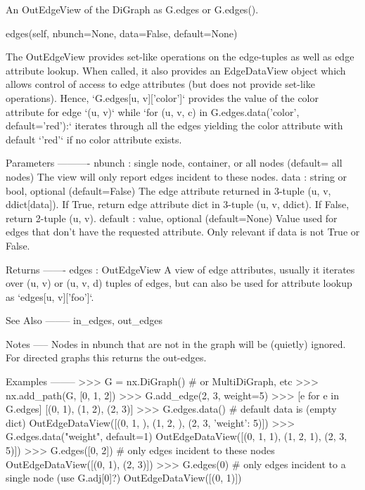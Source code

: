 \begin{DoxyVerb}An OutEdgeView of the DiGraph as G.edges or G.edges().

edges(self, nbunch=None, data=False, default=None)

The OutEdgeView provides set-like operations on the edge-tuples
as well as edge attribute lookup. When called, it also provides
an EdgeDataView object which allows control of access to edge
attributes (but does not provide set-like operations).
Hence, `G.edges[u, v]['color']` provides the value of the color
attribute for edge `(u, v)` while
`for (u, v, c) in G.edges.data('color', default='red'):`
iterates through all the edges yielding the color attribute
with default `'red'` if no color attribute exists.

Parameters
----------
nbunch : single node, container, or all nodes (default= all nodes)
    The view will only report edges incident to these nodes.
data : string or bool, optional (default=False)
    The edge attribute returned in 3-tuple (u, v, ddict[data]).
    If True, return edge attribute dict in 3-tuple (u, v, ddict).
    If False, return 2-tuple (u, v).
default : value, optional (default=None)
    Value used for edges that don't have the requested attribute.
    Only relevant if data is not True or False.

Returns
-------
edges : OutEdgeView
    A view of edge attributes, usually it iterates over (u, v)
    or (u, v, d) tuples of edges, but can also be used for
    attribute lookup as `edges[u, v]['foo']`.

See Also
--------
in_edges, out_edges

Notes
-----
Nodes in nbunch that are not in the graph will be (quietly) ignored.
For directed graphs this returns the out-edges.

Examples
--------
>>> G = nx.DiGraph()  # or MultiDiGraph, etc
>>> nx.add_path(G, [0, 1, 2])
>>> G.add_edge(2, 3, weight=5)
>>> [e for e in G.edges]
[(0, 1), (1, 2), (2, 3)]
>>> G.edges.data()  # default data is {} (empty dict)
OutEdgeDataView([(0, 1, {}), (1, 2, {}), (2, 3, {'weight': 5})])
>>> G.edges.data("weight", default=1)
OutEdgeDataView([(0, 1, 1), (1, 2, 1), (2, 3, 5)])
>>> G.edges([0, 2])  # only edges incident to these nodes
OutEdgeDataView([(0, 1), (2, 3)])
>>> G.edges(0)  # only edges incident to a single node (use G.adj[0]?)
OutEdgeDataView([(0, 1)])\end{DoxyVerb}
 \mbox{\label{classnetworkx_1_1classes_1_1digraph_1_1DiGraph_a62a8bd8026cec40400db72e222b2e4e1}} 
